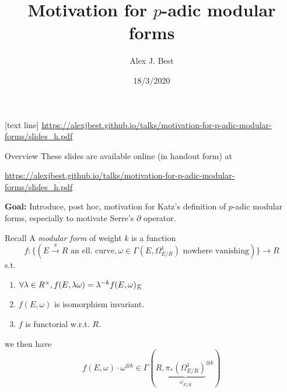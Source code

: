 \author{Alex J. Best}
\date{18/3/2020}
\title{Motivation for $p$-adic modular forms}
[text line]
{\url{https://alexjbest.github.io/talks/motivation-for-p-adic-modular-forms/slides_h.pdf}}


\begin{frame}
  \titlepage

\end{frame}


\begin{frame}{Overview}
    These slides are available online (in handout form) at

    \begin{centering}
        \url{https://alexjbest.github.io/talks/motivation-for-p-adic-modular-forms/slides_h.pdf}
    \end{centering} \pause

    \textbf{Goal:} Introduce, post hoc, motivation for Katz's definition of $p$-adic modular forms, especially to motivate Serre's $\partial$ operator.

\end{frame}

\begin{frame}{Recall}
    A \emph{modular form} of weight $k$ is a function
    \[f\colon \{(E \xrightarrow \pi R\text{ an ell.\ curve}, \omega\in \Gamma(E, \Omega^1_{E/R})\text{ nowhere vanishing})\}\to R\] \pause
    s.t.
    \begin{enumerate}
        \item \(\forall \lambda\in R^{\times},  f(E, \lambda \omega) = \lambda ^{-k} f(E, \omega)\)g
        \item \(f(E, \omega)\) is isomorphism invariant.
        \item \(f\) is functorial w.r.t. $R$.
    \end{enumerate} \pause
    we then have
    \[f(E, \omega) \cdot \omega^{\otimes k} \in \Gamma(R, {\underbrace{\pi_*(\Omega^1_{E/R})}_{\underline \omega_{E/R}}}^{\otimes k})\]

\end{frame}

